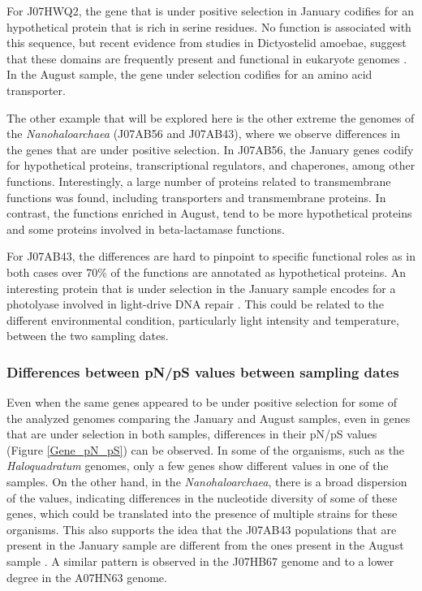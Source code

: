 For J07HWQ2, the gene that is under positive selection in January codifies for an hypothetical protein that is rich in serine residues. No function is associated with this sequence, but recent evidence from studies in Dictyostelid amoebae, suggest that these domains are frequently present and functional in eukaryote genomes \cite{Tian:2013jv}. In the August sample, the gene under selection codifies for an amino acid transporter.

The other example that will be explored here is the other extreme the genomes of the \textit{Nanohaloarchaea} (J07AB56 and J07AB43), where we observe differences in the genes that are under positive selection. In J07AB56, the January genes codify for hypothetical proteins, transcriptional regulators, and chaperones, among other functions. Interestingly, a large number of proteins related to transmembrane functions was found, including transporters and transmembrane proteins. In contrast, the functions enriched in August, tend to be more hypothetical proteins and some proteins involved in beta-lactamase functions. 

For J07AB43, the differences are hard to pinpoint to specific functional roles as in both cases over 70\% of the functions are annotated as hypothetical proteins. An interesting protein that is under selection in the January sample encodes for a photolyase involved in light-drive DNA repair \cite{Weber:2005fk}. This could be related to the different environmental condition, particularly light intensity and temperature, between the two sampling dates.

\subsubsection{Differences between pN/pS values between sampling dates}

Even when the same genes appeared to be under positive selection for some of the analyzed genomes comparing the January and August samples, even in genes that are under selection in both samples, differences in their pN/pS values (Figure \ref{Gene_pN_pS}) can be observed. In some of the organisms, such as the \textit{Haloquadratum} genomes, only a few genes show different values in one of the samples. On the other hand, in the \textit{Nanohaloarchaea}, there is a broad dispersion of the values, indicating differences in the nucleotide diversity of some of these genes, which could be translated into the presence of multiple strains for these organisms. This also supports the idea that the J07AB43 populations that are present in the January sample are different from the ones present in the August sample \cite{Vos:2011ux}. A similar pattern is observed in the J07HB67 genome and to a lower degree in the A07HN63 genome.



